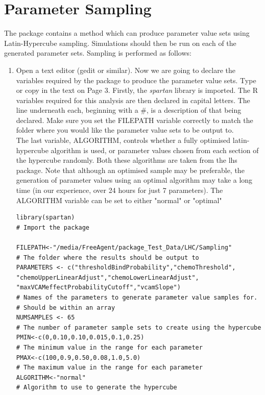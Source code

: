 \documentclass[a4paper,11pt]{article}
\begin{document}
\section{Parameter Sampling}
\noindent The package contains a method which can produce parameter value sets using Latin-Hypercube sampling. Simulations should then be run on each of the generated parameter sets.  Sampling is performed as follows:\\
\begin{enumerate}
\item Open a text editor (gedit or similar).  Now we are going to declare the variables required by the package to produce the parameter value sets. Type or copy in the text on Page 3.  Firstly, the \textit{spartan} library is imported. The R variables required for this analysis are then declared in capital letters. The line underneath each, beginning with a \#, is a description of that being declared. Make sure you set the FILEPATH variable correctly to match the folder where you would like the parameter value sets to be output to.
\\
The last variable, ALGORITHM, controls whether a fully optimised latin-hypercube algorithm is used, or parameter values chosen from each section of the hypercube randomly. Both these algorithms are taken from the lhs package. Note that although an optimised sample may be preferable, the generation of parameter values using an optimal algorithm may take a long time (in our experience, over 24 hours for just 7 parameters). The ALGORITHM variable can be set to either "normal" or "optimal"

\begin{verbatim}
library(spartan)
# Import the package

FILEPATH<-"/media/FreeAgent/package_Test_Data/LHC/Sampling"
# The folder where the results should be output to
PARAMETERS <- c("thresholdBindProbability","chemoThreshold",
"chemoUpperLinearAdjust","chemoLowerLinearAdjust",
"maxVCAMeffectProbabilityCutoff","vcamSlope")
# Names of the parameters to generate parameter value samples for.
# Should be within an array
NUMSAMPLES <- 65
# The number of parameter sample sets to create using the hypercube
PMIN<-c(0,0.10,0.10,0.015,0.1,0.25) 
# The minimum value in the range for each parameter
PMAX<-c(100,0.9,0.50,0.08,1.0,5.0)
# The maximum value in the range for each parameter
ALGORITHM<-"normal"
# Algorithm to use to generate the hypercube

\end{verbatim}


\end{enumerate}
\end{document}
